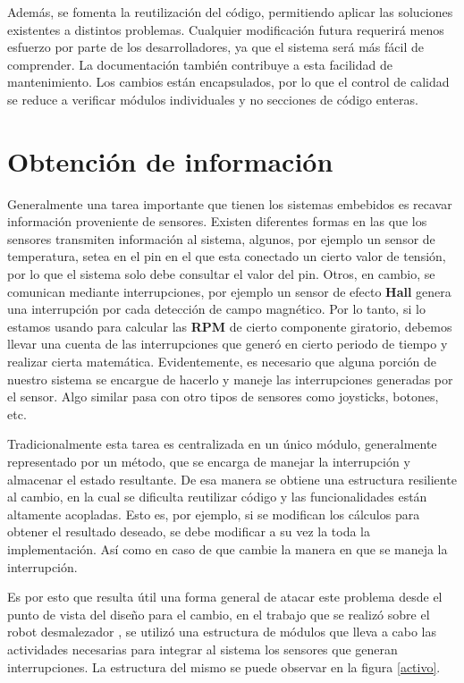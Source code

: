 Además, se fomenta la reutilización del código, permitiendo aplicar las soluciones existentes a distintos problemas. Cualquier modificación futura requerirá menos esfuerzo por parte de los desarrolladores, ya que el sistema será más fácil de comprender. La documentación también contribuye a esta facilidad de mantenimiento. Los cambios están encapsulados, por lo que el control de calidad se reduce a verificar módulos individuales y no secciones de código enteras.


\newpage
\section{Obtención de información}
\label{obtInfo}

Generalmente una tarea importante que tienen los sistemas embebidos es recavar información proveniente de sensores. Existen diferentes formas en las que los sensores transmiten información al sistema, algunos, por ejemplo un sensor de temperatura, setea en el pin en el que esta conectado un cierto valor de tensión, por lo que el sistema solo debe consultar el valor del pin. Otros, en cambio, se comunican mediante interrupciones, por ejemplo un sensor de efecto \textbf{Hall} genera una interrupción por cada detección de campo magnético. Por lo tanto, si lo estamos usando para calcular las \textbf{RPM} de cierto componente giratorio, debemos llevar una cuenta de las interrupciones que generó en cierto periodo de tiempo y realizar cierta matemática. Evidentemente, es necesario que alguna porción de nuestro sistema se encargue de hacerlo y maneje las interrupciones generadas por el sensor. Algo similar pasa con otro tipos de sensores como joysticks, botones, etc.

Tradicionalmente esta tarea es centralizada en un único módulo, generalmente representado por un método, que se encarga de manejar la interrupción y almacenar el estado resultante. De esa manera se obtiene una estructura resiliente al cambio, en la cual se dificulta reutilizar código y las funcionalidades están altamente acopladas. Esto es, por ejemplo, si se modifican los cálculos para obtener el resultado deseado, se debe modificar a su vez la toda la implementación. Así como en caso de que cambie la manera en que se maneja la interrupción.

Es por esto que resulta útil una forma general de atacar este problema desde el punto de vista del diseño para el cambio, en el trabajo que se realizó sobre el robot desmalezador \cite{paperPomponio}, se utilizó una estructura de módulos que lleva a cabo las actividades necesarias para integrar al sistema los sensores que generan interrupciones. La estructura del mismo se puede observar en la figura \ref{activo}.

